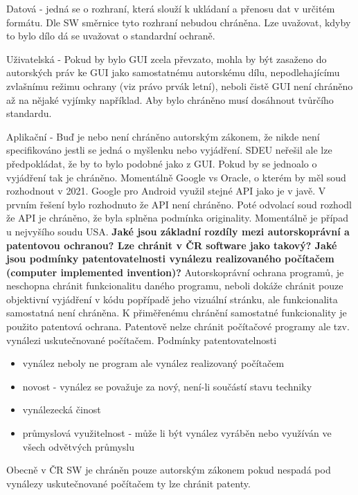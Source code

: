 \documentclass[12pt,a4paper,czech]{report}
\newcommand{\nadpis}[1]{\noindent\textbf{\Large{#1}}\normalsize}
\begin{document}
Datová - jedná se o rozhraní, která slouží k ukládaní a přenosu dat v určitém formátu. Dle SW směrnice tyto rozhraní nebudou chráněna. Lze uvažovat, kdyby to bylo dílo dá se uvažovat o standardní ochraně.

Uživatelská - Pokud by bylo GUI zcela převzato, mohla by být zasaženo do autorských práv ke GUI jako samostatnému autorskému dílu, nepodlehajícímu zvlašnímu režimu ochrany (viz právo prvák letní), neboli čistě GUI není chráněno až na nějaké vyjímky například. Aby bylo chráněno musí dosáhnout tvůrčího standardu.

Aplikační - Buď je nebo není chráněno autorským zákonem, že nikde není specifikováno jestli se jedná o myšlenku nebo vyjádření. SDEU neřešil ale lze předpokládat, že by to bylo podobné jako z GUI. Pokud by se jednoalo o vyjádření tak je chráněno. Momentálně Google vs Oracle, o kterém by měl soud rozhodnout v 2021. Google pro Android využil stejné API jako je v javě. V prvním řešení bylo rozhodnuto že API není chráněno. Poté odvolací soud rozhodl že API je chráněno, že byla splněna podmínka originality. Momentálně je případ u nejvyšího soudu USA.
\newline
\newline
\nadpis{Jaké jsou základní rozdíly mezi autorskoprávní a patentovou ochranou? Lze chránit v ČR software jako takový? Jaké jsou podmínky patentovatelnosti vynálezu realizovaného počítačem (computer implemented invention)?}
\newline
\newline
Autorskoprávní ochrana programů, je neschopna chránit funkcionalitu daného programu, neboli dokáže chránit pouze objektivní vyjádření v kódu popřípadě jeho vizuální stránku, ale funkcionalita samostatná není chráněna. K přiměřenému chránění samostatné funkcionality je použito patentová ochrana. Patentově nelze chránit počítačové programy ale tzv. vynálezi uskutečnované počítačem.  
Podmínky patentovatelnosti
\begin{itemize}
    \item  vynález neboly ne program ale vynález realizovaný počítačem
    \item novost - vynález se považuje za nový, není-li součástí stavu techniky
    \item vynálezecká činost
    \item průmyslová využitelnost - může li být vynález vyráběn nebo využíván ve všech odvětvých průmyslu
\end{itemize}
Obecně v ČR SW je chráněn pouze autorským zákonem pokud nespadá pod vynálezy uskutečnované počítačem ty lze chránit patenty.  
\end{document}
